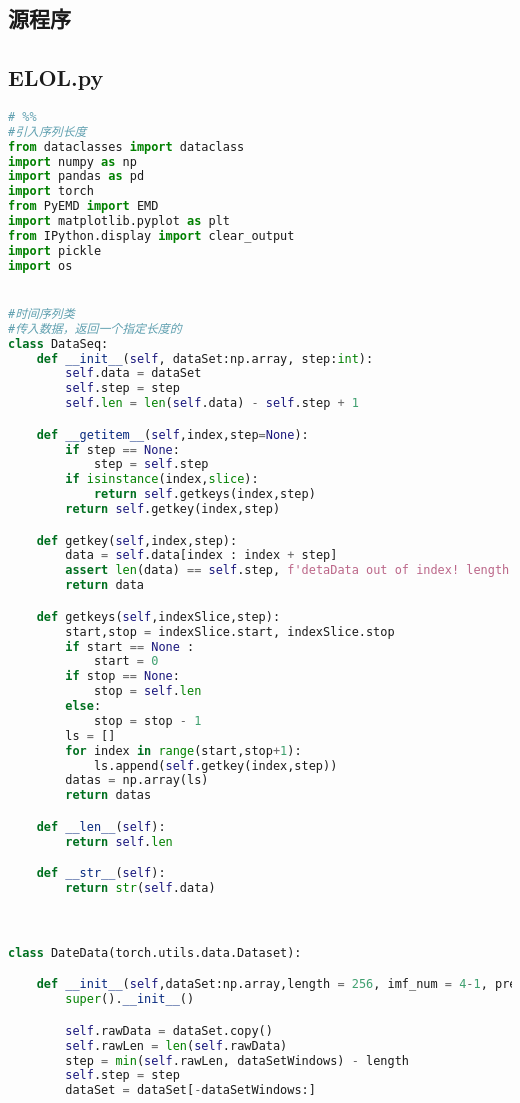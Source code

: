 \printbibliography
\newpage
\begin{appendices}

\section{源程序}
\subsection{ELOL.py} %
\label{sub:elol}

\begin{lstlisting}[language=python]
# %%
#引入序列长度
from dataclasses import dataclass
import numpy as np
import pandas as pd
import torch
from PyEMD import EMD
import matplotlib.pyplot as plt
from IPython.display import clear_output
import pickle
import os


#时间序列类
#传入数据，返回一个指定长度的
class DataSeq:
    def __init__(self, dataSet:np.array, step:int):
        self.data = dataSet
        self.step = step
        self.len = len(self.data) - self.step + 1

    def __getitem__(self,index,step=None):
        if step == None:
            step = self.step
        if isinstance(index,slice):
            return self.getkeys(index,step)
        return self.getkey(index,step)

    def getkey(self,index,step):
        data = self.data[index : index + step]
        assert len(data) == self.step, f'detaData out of index! length is {self.len} but index is {index}'
        return data

    def getkeys(self,indexSlice,step):
        start,stop = indexSlice.start, indexSlice.stop
        if start == None :
            start = 0
        if stop == None:
            stop = self.len
        else:
            stop = stop - 1
        ls = []
        for index in range(start,stop+1):
            ls.append(self.getkey(index,step))
        datas = np.array(ls)
        return datas

    def __len__(self):
        return self.len

    def __str__(self):
        return str(self.data)



class DateData(torch.utils.data.Dataset):

    def __init__(self,dataSet:np.array,length = 256, imf_num = 4-1, pre_num=1, dataSetWindows=1000):
        super().__init__()

        self.rawData = dataSet.copy()
        self.rawLen = len(self.rawData)
        step = min(self.rawLen, dataSetWindows) - length
        self.step = step
        dataSet = dataSet[-dataSetWindows:]


\end{lstlisting}
\end{appendices}
